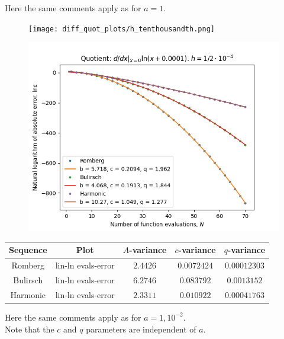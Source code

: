 Here the same comments apply as for \(a = 1\).

\begin{figure}[H]
\centering
\begin{minipage}{0.45\textwidth}
\centering
\texttt{[image: diff\_quot\_plots/h\_tenthousandth.png]}
\end{minipage}
\begin{minipage}{0.45\textwidth}
\centering
\includegraphics[scale=0.45]{diff_quot_plots/h_tenthousandth_hp_trend.png}
\end{minipage}
\end{figure}

\begin{table}[H]
    \centering
    \begin{tabular}{c|c||c|c|c}
Sequence & Plot & \(A\)-variance & \(c\)-variance & \(q\)-variance\\\hline
Romberg & lin-ln evals-error & \(2.4426\) & \(0.0072424\) & \(0.00012303\) \\
Bulirsch & lin-ln evals-error & \(6.2746\) & \(0.083792\) & \(0.0013152\) \\
Harmonic & lin-ln evals-error & \(2.3311\) & \(0.010922\) & \(0.00041763\) \\
    \end{tabular}
    \label{tab:my_label}
\end{table}

Here the same comments apply as for \(a= 1,10^{-2}\).\\

Note that the \(c\) and \(q\) parameters are independent of \(a\).

